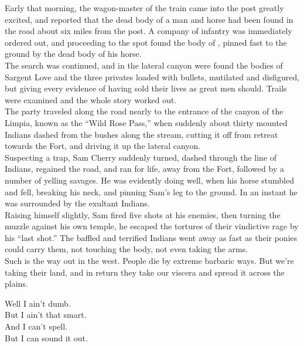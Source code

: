 Early that morning, the wagon-master of the train came into the post greatly excited, and reported that the dead body of a man and horse had been found in the road about six miles from the post. A company of infantry was immediately ordered out, and proceeding to the spot found the body of , pinned fast to the ground by the dead body of his horse. \\

The search was continued, and in the lateral canyon were found the bodies of Sargent Love and the three privates loaded with bullets, mutilated and disfigured, but giving every evidence of having sold their lives as great men should. Trails were examined and the whole story worked out. \\

The party traveled along the road nearly to the entrance of the canyon of the Limpia, known as the ``Wild Rose Pass,'' when suddenly about thirty mounted Indians dashed from the bushes along the stream, cutting it off from retreat towards the Fort, and driving it up the lateral canyon. \\

Suspecting a trap, Sam Cherry suddenly turned, dashed through the line of Indians, regained the road, and ran for life, away from the Fort, followed by a number of yelling savages. He was evidently doing well, when his horse stumbled and fell, breaking his neck, and pinning Sam's leg to the ground. In an instant he was surrounded by the exultant Indians. \\

Raising himself slightly, Sam fired five shots at his enemies, then turning the muzzle against his own temple, he escaped the tortures of their vindictive rage by his ``last shot.'' The baffled and terrified Indians went away as fast as their ponies could carry them, not touching the body, not even taking the arms. \\

Such is the way out in the west. People die by extreme barbaric ways. But we're taking their land, and in return they take our viscera and spread it across the  plains. \\




Well I ain't dumb. \\
But I ain't that smart. \\
And I can't spell. \\
But I can sound it out. \\

